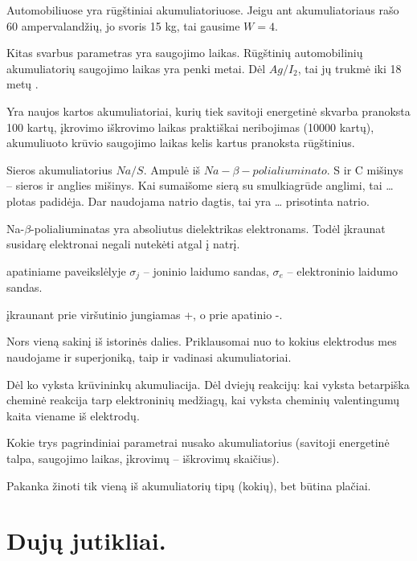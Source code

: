 Automobiliuose yra rūgštiniai akumuliatoriuose. Jeigu ant akumuliatoriaus
rašo 60 ampervalandžių, jo svoris 15 kg, tai gausime $W=4$.

Kitas svarbus parametras yra saugojimo laikas. Rūgštinių automobilinių
akumuliatorių saugojimo laikas yra penki metai. Dėl $Ag/I_{2}$, tai
jų trukmė iki 18 metų .

Yra naujos kartos akumuliatoriai, kurių tiek savitoji energetinė
skvarba pranoksta 100 kartų, įkrovimo iškrovimo laikas praktiškai
neribojimas (10000 kartų), akumuliuoto krūvio saugojimo laikas
kelis kartus pranoksta rūgštinius.

Sieros akumuliatorius  $Na/S$. Ampulė iš
$Na-\beta-polialiuminato$. S ir C mišinys – sieros ir anglies mišinys.
Kai sumaišome sierą su smulkiagrūde anglimi, tai … plotas padidėja.
Dar naudojama natrio dagtis, tai yra … prisotinta natrio.

Na-$\beta$-polialiuminatas yra absoliutus dielektrikas elektronams.
Todėl įkraunat susidarę elektronai negali nutekėti atgal į natrį.

 apatiniame paveikslėlyje $\sigma_{j}$ – joninio laidumo
sandas, $\sigma_{e}$ – elektroninio laidumo sandas.

 įkraunant prie viršutinio jungiamas +, o prie apatinio
-.

\begin{remember}
  \item Nors vieną sakinį iš istorinės dalies. Priklausomai nuo to
    kokius elektrodus mes naudojame ir superjoniką, taip ir vadinasi
    akumuliatoriai.
  \item Dėl ko vyksta krūvininkų akumuliacija. Dėl dviejų reakcijų:
    kai vyksta betarpiška cheminė reakcija tarp elektroninių medžiagų,
    kai vyksta cheminių valentingumų kaita viename iš elektrodų.
  \item Kokie trys pagrindiniai parametrai nusako akumuliatorius
    (savitoji energetinė talpa, saugojimo laikas, įkrovimų – iškrovimų
    skaičius).
  \item Pakanka žinoti tik vieną iš akumuliatorių tipų (kokių),
    bet būtina plačiai.
\end{remember}

\section{Dujų jutikliai.}

